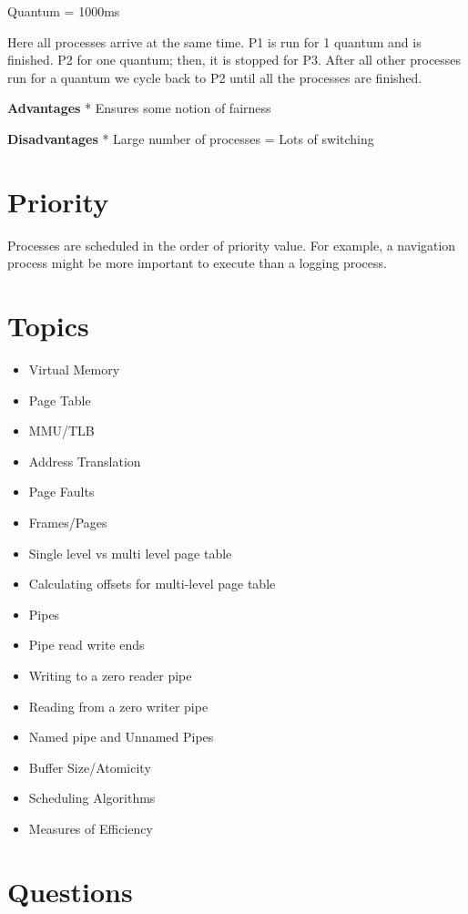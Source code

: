 Quantum = 1000ms

Here all processes arrive at the same time. P1 is run for 1 quantum and
is finished. P2 for one quantum; then, it is stopped for P3. After all
other processes run for a quantum we cycle back to P2 until all the
processes are finished.

\textbf{Advantages} * Ensures some notion of fairness

\textbf{Disadvantages} * Large number of processes = Lots of switching

\section{Priority}\label{priority}

Processes are scheduled in the order of priority value. For example, a
navigation process might be more important to execute than a logging
process.

\section{Topics}\label{topics}

\begin{itemize}
\tightlist
\item
  Virtual Memory
\item
  Page Table
\item
  MMU/TLB
\item
  Address Translation
\item
  Page Faults
\item
  Frames/Pages
\item
  Single level vs multi level page table
\item
  Calculating offsets for multi-level page table
\item
  Pipes
\item
  Pipe read write ends
\item
  Writing to a zero reader pipe
\item
  Reading from a zero writer pipe
\item
  Named pipe and Unnamed Pipes
\item
  Buffer Size/Atomicity
\item
  Scheduling Algorithms
\item
  Measures of Efficiency
\end{itemize}

\section{Questions}\label{questions}

